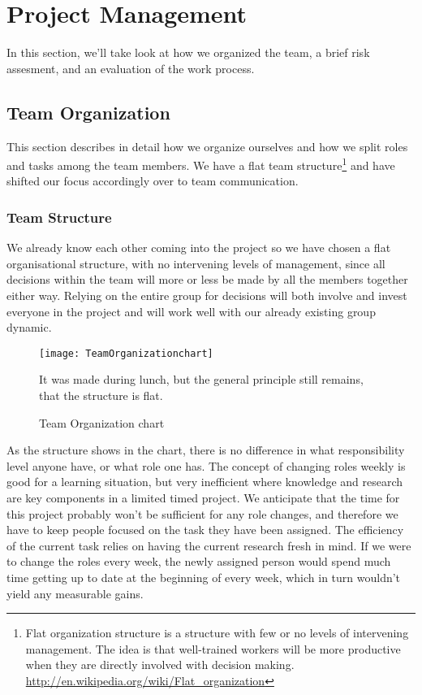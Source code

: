 \section{Project Management}\label{Project Management} 
    In this section, we'll take look at how we organized the team, a brief risk assesment, and an evaluation of the work process. 
    
    \subsection{Team Organization}\label{Team Organization} 
        This section describes in detail how we organize ourselves and how we split roles and tasks among the team members. We have a flat team structure\footnote{Flat organization structure is a structure with few or no levels of intervening management. The idea is that well-trained workers will be more productive when they are directly involved with decision making. \url{http://en.wikipedia.org/wiki/Flat_organization}}  and have shifted our focus accordingly over to team communication. 
    
    \subsubsection{Team Structure}\label{Team Structure}
    We already know each other coming into the project so we have chosen a flat organisational structure, with no intervening levels of management, since all decisions within the team will more or less be made by all the members together either way. Relying on the entire group for decisions will both involve and invest everyone in the project and will work well with our already existing group dynamic.

    \begin{figure}[h]
        \centering
        \texttt{[image: TeamOrganizationchart]}
        \caption{Team Organization chart}
        It was made during lunch, but the general principle still remains, that the structure is flat.
        \label{fig:TeamOrganizationchart}
    \end{figure}
    
    As the structure shows in the chart, there is no difference in what responsibility level anyone have, or what role one has. The concept of changing roles weekly is good for a learning situation, but very inefficient where knowledge and research are key components in a limited timed project. We anticipate that the time for this project probably won't be sufficient for any role changes, and therefore we have to keep people focused on the task they have been assigned. The efficiency of the current task relies on having the current research fresh in mind. If we were to change the roles every week, the newly assigned person would spend much time getting up to date at the beginning of every week, which in turn wouldn't yield any measurable gains. 
    
